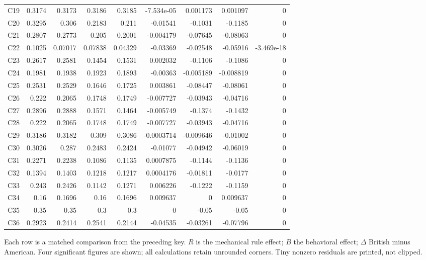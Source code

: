 \documentclass[10pt]{article}
\begin{document}
\begin{longtable}{@{}lrrrrrrrr@{}}
C19 & 0.3174 & 0.3173 & 0.3186 & 0.3185 & -7.534e-05 & 0.001173 & 0.001097 & 0\\[1pt]
C20 & 0.3295 & 0.306 & 0.2183 & 0.211 & -0.01541 & -0.1031 & -0.1185 & 0\\[1pt]
C21 & 0.2807 & 0.2773 & 0.205 & 0.2001 & -0.004179 & -0.07645 & -0.08063 & 0\\[1pt]
C22 & 0.1025 & 0.07017 & 0.07838 & 0.04329 & -0.03369 & -0.02548 & -0.05916 & -3.469e-18\\[1pt]
C23 & 0.2617 & 0.2581 & 0.1454 & 0.1531 & 0.002032 & -0.1106 & -0.1086 & 0\\[1pt]
C24 & 0.1981 & 0.1938 & 0.1923 & 0.1893 & -0.00363 & -0.005189 & -0.008819 & 0\\[1pt]
C25 & 0.2531 & 0.2529 & 0.1646 & 0.1725 & 0.003861 & -0.08447 & -0.08061 & 0\\[1pt]
C26 & 0.222 & 0.2065 & 0.1748 & 0.1749 & -0.007727 & -0.03943 & -0.04716 & 0\\[1pt]
C27 & 0.2896 & 0.2888 & 0.1571 & 0.1464 & -0.005749 & -0.1374 & -0.1432 & 0\\[1pt]
C28 & 0.222 & 0.2065 & 0.1748 & 0.1749 & -0.007727 & -0.03943 & -0.04716 & 0\\[1pt]
C29 & 0.3186 & 0.3182 & 0.309 & 0.3086 & -0.0003714 & -0.009646 & -0.01002 & 0\\[1pt]
C30 & 0.3026 & 0.287 & 0.2483 & 0.2424 & -0.01077 & -0.04942 & -0.06019 & 0\\[1pt]
C31 & 0.2271 & 0.2238 & 0.1086 & 0.1135 & 0.0007875 & -0.1144 & -0.1136 & 0\\[1pt]
C32 & 0.1394 & 0.1403 & 0.1218 & 0.1217 & 0.0004176 & -0.01811 & -0.0177 & 0\\[1pt]
C33 & 0.243 & 0.2426 & 0.1142 & 0.1271 & 0.006226 & -0.1222 & -0.1159 & 0\\[1pt]
C34 & 0.16 & 0.1696 & 0.16 & 0.1696 & 0.009637 & 0 & 0.009637 & 0\\[1pt]
C35 & 0.35 & 0.35 & 0.3 & 0.3 & 0 & -0.05 & -0.05 & 0\\[1pt]
C36 & 0.2923 & 0.2414 & 0.2541 & 0.2144 & -0.04535 & -0.03261 & -0.07796 & 0\\[1pt]
\end{longtable}\normalsize
{}\par\medskip
Each row is a matched comparison from the preceding key. $R$ is the mechanical rule effect; $B$ the behavioral effect; $\Delta$ British minus American. Four significant figures are shown; all calculations retain unrounded corners. Tiny nonzero residuals are printed, not clipped.\par\medskip
\end{document}
